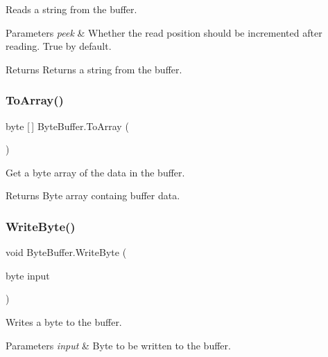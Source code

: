Reads a string from the buffer. 


\begin{DoxyParams}{Parameters}
{\em peek} & Whether the read position should be incremented after reading. True by default.\\
\hline
\end{DoxyParams}
\begin{DoxyReturn}{Returns}
Returns a string from the buffer.
\end{DoxyReturn}
\mbox{\label{class_byte_buffer_a52290714c9deb79ac6f7039aa566147c}} 
\subsubsection{\texorpdfstring{ToArray()}{ToArray()}}
{\footnotesize\ttfamily byte \mbox{[}$\,$\mbox{]} Byte\+Buffer.\+To\+Array (\begin{DoxyParamCaption}{ }\end{DoxyParamCaption})}



Get a byte array of the data in the buffer. 

\begin{DoxyReturn}{Returns}
Byte array containg buffer data.
\end{DoxyReturn}
\mbox{\label{class_byte_buffer_a7650f89f25ac6d9770a502c294a4f6a8}} 
\subsubsection{\texorpdfstring{WriteByte()}{WriteByte()}}
{\footnotesize\ttfamily void Byte\+Buffer.\+Write\+Byte (\begin{DoxyParamCaption}\item[{byte}]{input }\end{DoxyParamCaption})}



Writes a byte to the buffer. 


\begin{DoxyParams}{Parameters}
{\em input} & Byte to be written to the buffer.\\
\hline
\end{DoxyParams}
\mbox{\label{class_byte_buffer_abbb2d979bae5a3d06df65de86979aa75}} 

